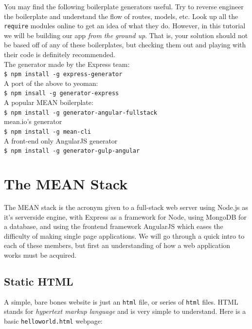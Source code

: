 You may find the following boilerplate generators useful. Try to reverse
engineer the boilerplate and understand the flow of routes, models, etc.
Look up all the \texttt{require} modules online to get an idea of what they
do. However, in this tutorial we will be building our app \textit{from the
ground up}. That is, your solution should not be based off of any of these
boilerplates, but checking them out and playing with their code is definitely
recommended. \\

\noindent The generator made by the Express team: \\
\texttt{\$ npm install -g express-generator} \\ 
A port of the above to yeoman: \\
\texttt{\$ npm insall -g generator-express} \\
A popular MEAN boilerplate: \\
\texttt{\$ npm install -g generator-angular-fullstack} \\
mean.io's generator \\
\texttt{\$ npm install -g mean-cli} \\
A front-end only AngularJS generator \\
\texttt{\$ npm install -g generator-gulp-angular}

\section{The MEAN Stack}

The MEAN stack is the acronym given to a full-stack web server using Node.js as
it's serverside engine, with Express as a framework for Node, using MongoDB for
a database, and using the frontend framework AngularJS which eases the 
difficulty of making single page applications. We will go through a quick intro
to each of these members, but first an understanding of how a web application
works must be acquired. 


\subsection{Static HTML}

A simple, bare bones website is just an \texttt{html} file, or series of
\texttt{html} files. HTML stands for \textit{hypertext markup language} and is 
very simple to understand. Here is a basic \texttt{helloworld.html} webpage:


